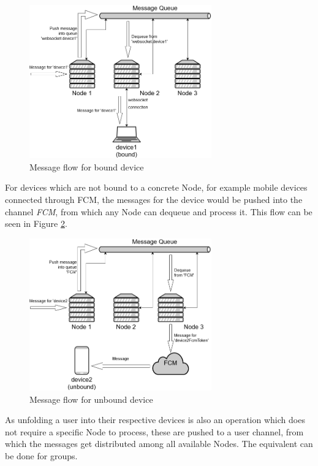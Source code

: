 \begin{figure}[!ht]
	\centering
	\includegraphics[width=0.7\textwidth]{figures/03_design/mq-ws-device}
    \caption{Message flow for bound device}
    \label{fig:mq-ws-device}
\end{figure}

For devices which are not bound to a concrete Node, for example mobile devices connected through FCM, the messages for the device would be pushed into the channel \textit{FCM}, from which any Node can dequeue and process it. This flow can be seen in Figure \ref{fig:mq-fcm-device}.

\begin{figure}[!ht]
	\centering
	\includegraphics[width=0.7\textwidth]{figures/03_design/mq-fcm-device}
    \caption{Message flow for unbound device}
    \label{fig:mq-fcm-device}
\end{figure}

As unfolding a user into their respective devices is also an operation which does not require a specific Node to process, these are pushed to a user channel, from which the messages get distributed among all available Nodes. The equivalent can be done for groups.

